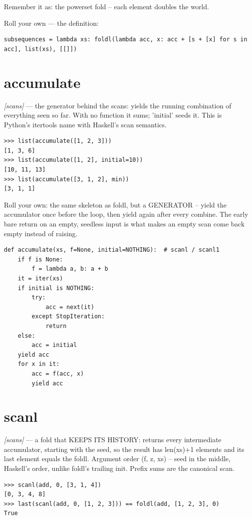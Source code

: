 \documentclass[11pt,letterpaper]{book}
\begin{document}
Remember it as: the powerset fold -- each element doubles the world.


Roll your own --- the definition:

\begin{lstlisting}[style=code]
subsequences = lambda xs: foldl(lambda acc, x: acc + [s + [x] for s in acc], list(xs), [[]])
\end{lstlisting}

\section{accumulate}
\noindent\textit{[scans]} --- the generator behind the scans: yields the running combination of everything seen so far. With no function it sums; 'initial' seeds it. This is Python's itertools name with Haskell's scan semantics.
\begin{lstlisting}[style=spec]
>>> list(accumulate([1, 2, 3]))
[1, 3, 6]
>>> list(accumulate([1, 2], initial=10))
[10, 11, 13]
>>> list(accumulate([3, 1, 2], min))
[3, 1, 1]
\end{lstlisting}

Roll your own: the same skeleton as foldl, but a GENERATOR -- yield the accumulator once before the loop, then yield again after every combine. The early bare return on an empty, seedless input is what makes an empty scan come back empty instead of raising.

\begin{lstlisting}[style=code]
def accumulate(xs, f=None, initial=NOTHING):  # scanl / scanl1
    if f is None:
        f = lambda a, b: a + b
    it = iter(xs)
    if initial is NOTHING:
        try:
            acc = next(it)
        except StopIteration:
            return
    else:
        acc = initial
    yield acc
    for x in it:
        acc = f(acc, x)
        yield acc
\end{lstlisting}

\section{scanl}
\noindent\textit{[scans]} --- a fold that KEEPS ITS HISTORY: returns every intermediate accumulator, starting with the seed, so the result has len(xs)+1 elements and its last element equals the foldl. Argument order (f, z, xs) -- seed in the middle, Haskell's order, unlike foldl's trailing init. Prefix sums are the canonical scan.
\begin{lstlisting}[style=spec]
>>> scanl(add, 0, [3, 1, 4])
[0, 3, 4, 8]
>>> last(scanl(add, 0, [1, 2, 3])) == foldl(add, [1, 2, 3], 0)
True
\end{lstlisting}
\end{document}
